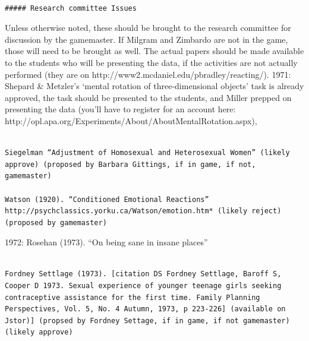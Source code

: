 \begin{adjustwidth}{2.5em}{2.5em}
\begin{verbatim}

##### Research committee Issues

\end{verbatim}
\end{adjustwidth}

Unless otherwise noted, these should be brought to the research committee for discussion by the gamemaster. If Milgram and Zimbardo are not in the game, those will need to be brought as well. The actual papers should be made available to the students who will be presenting the data, if the activities are not actually performed (they are on http:\slash \slash www2.mcdaniel.edu\slash pbradley\slash reacting\slash ).
1971:
 Shepard \& Metzler's `mental rotation of three-dimensional objects' task is already approved, the task should be presented to the students, and Miller prepped on presenting the data (you'll have to register for an account here: http:\slash \slash opl.apa.org\slash Experiments\slash About\slash AboutMentalRotation.aspx), 

\begin{adjustwidth}{2.5em}{2.5em}
\begin{verbatim}

Siegelman “Adjustment of Homosexual and Heterosexual Women” (likely approve) (proposed by Barbara Gittings, if in game, if not, gamemaster)

Watson (1920). “Conditioned Emotional Reactions” http://psychclassics.yorku.ca/Watson/emotion.htm* (likely reject) (proposed by gamemaster)

\end{verbatim}
\end{adjustwidth}

1972:
 Rosehan (1973). “On being sane in insane places” 

\begin{adjustwidth}{2.5em}{2.5em}
\begin{verbatim}

Fordney Settlage (1973). [citation DS Fordney Settlage, Baroff S, Cooper D 1973. Sexual experience of younger teenage girls seeking contraceptive assistance for the first time. Family Planning Perspectives, Vol. 5, No. 4 Autumn, 1973, p 223-226] (available on Jstor)] (propsed by Fordney Settage, if in game, if not gamemaster) (likely approve)

\end{verbatim}
\end{adjustwidth}

